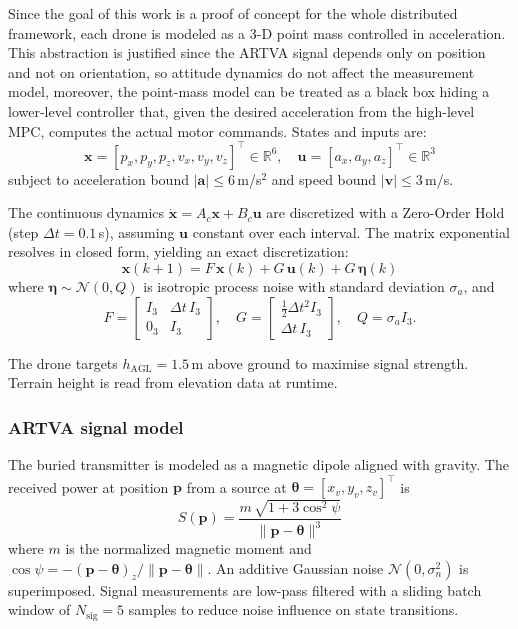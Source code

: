 \documentclass[journal,10pt,twocolumn]{IEEEtran}
\begin{document}
Since the goal of this work is a proof of concept for the whole
distributed framework, each drone is modeled as a 3-D point mass
controlled in acceleration.  This abstraction is justified since the ARTVA signal depends only on position and not on
orientation, so attitude dynamics do not affect the measurement model, moreover, the point-mass model can be treated as a black box hiding a
lower-level controller that, given the desired acceleration from the
high-level MPC, computes the actual motor commands.  States and inputs are:
\begin{equation}
  \mathbf{x} = [p_x, p_y, p_z, v_x, v_y, v_z]^\top \in \mathbb{R}^6,
  \quad
  \mathbf{u} = [a_x, a_y, a_z]^\top \in \mathbb{R}^3
  \label{eq:dynamics}
\end{equation}
subject to acceleration bound $|\mathbf{a}| \leq 6$\,m/s$^2$ and
speed bound $|\mathbf{v}| \leq 3$\,m/s.

The continuous dynamics $\dot{\mathbf{x}} = A_c \mathbf{x} + B_c
\mathbf{u}$ are discretized with a Zero-Order Hold (step
$\Delta t = 0.1$\,s), assuming $\mathbf{u}$ constant over each interval.
The matrix exponential resolves in closed form, yielding an exact
discretization:
\begin{equation}
  \mathbf{x}(k+1) = F\,\mathbf{x}(k) + G\,\mathbf{u}(k) +
  G\,\bm{\eta}(k)
  \label{eq:zoh}
\end{equation}
where $\bm{\eta} \sim \mathcal{N}(0, Q)$ is isotropic process noise
with standard deviation $\sigma_a$, and
\begin{equation}
  F = \begin{bmatrix} I_3 & \Delta t\,I_3 \\ 0_3 & I_3 \end{bmatrix},
  \quad
  G = \begin{bmatrix} \tfrac{1}{2}\Delta t^2 I_3 \\ \Delta t\,I_3
  \end{bmatrix},
  \quad
  Q = \sigma_a I_3.
\end{equation}

The drone targets $h_{\text{AGL}} = 1.5$\,m above ground to maximise
signal strength. Terrain height is read from elevation data at runtime.

\subsubsection{ARTVA signal model}

The buried transmitter is modeled as a magnetic dipole aligned with
gravity.  The received power at position $\mathbf{p}$ from a source at
$\bm{\theta} = [x_v, y_v, z_v]^\top$ is
\begin{equation}
  S(\mathbf{p}) = \frac{m\,\sqrt{1 + 3\cos^2\!\psi}}{\|\mathbf{p} -
  \bm{\theta}\|^3}
  \label{eq:artva}
\end{equation}
where $m$ is the normalized magnetic moment and $\cos\psi =
-(\mathbf{p} - \bm{\theta})_z / \|\mathbf{p} - \bm{\theta}\|$.
An additive Gaussian noise $\mathcal{N}(0, \sigma_n^2)$ is
superimposed.  Signal measurements are low-pass filtered with a sliding
batch window of $N_{\text{sig}} = 5$ samples to reduce noise influence
on state transitions.
\end{document}
